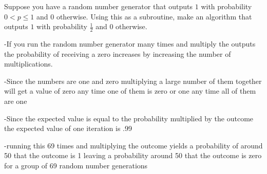\documentclass[12pt]{article}
\newenvironment{problem}[2][Problem]
{\begin{trivlist}
\item[\hskip \labelsep {\bfseries #1}\hskip \labelsep {\bfseries #2.}]}{\end{trivlist}}
\begin{document}
\begin{problem}{2}
Suppose you have a random number generator that outputs $1$ with probability $0 < p \le 1$ and $0$ otherwise. Using this as a subroutine, make an algorithm that outputs $1$ with probability $\frac{1}{2}$ and $0$ otherwise.

-If you run the random number generator many times and multiply the outputs the probability of receiving a zero increases by increasing the number of multiplications.

-Since the numbers are one and zero multiplying a large number of them together will get a value of zero any time one of them is zero or one any time all of them are one

-Since the expected value is equal to the probability multiplied by the outcome the expected value of one iteration is .99

-running this 69 times and multiplying the outcome yields a probability of around 50 that the outcome is 1 leaving a probability around 50 that the outcome is zero for a group of 69 random number generations

\end{problem}
\end{document}
